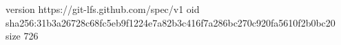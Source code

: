 version https://git-lfs.github.com/spec/v1
oid sha256:31b3a26728c68fc5eb9f1224e7a82b3c416f7a286bc270c920fa5610f2b0bc20
size 726
